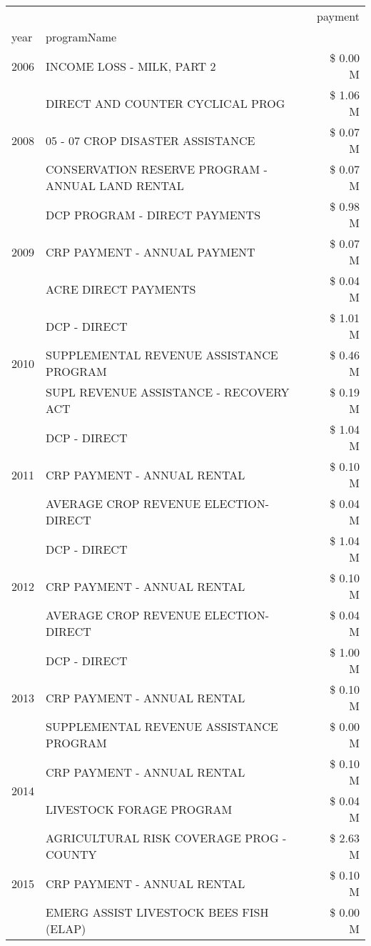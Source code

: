 \begin{tabular}{llr}
\toprule
 &  & payment \\
year & programName &  \\
\midrule
2006 & INCOME LOSS - MILK, PART 2 & \$ 0.00 M \\
\cline{1-3}
\multirow[t]{3}{*}{2008} & DIRECT AND COUNTER CYCLICAL PROG & \$ 1.06 M \\
 & 05 - 07 CROP DISASTER ASSISTANCE & \$ 0.07 M \\
 & CONSERVATION RESERVE PROGRAM - ANNUAL LAND RENTAL & \$ 0.07 M \\
\cline{1-3}
\multirow[t]{3}{*}{2009} & DCP PROGRAM - DIRECT PAYMENTS & \$ 0.98 M \\
 & CRP PAYMENT - ANNUAL PAYMENT & \$ 0.07 M \\
 & ACRE DIRECT PAYMENTS & \$ 0.04 M \\
\cline{1-3}
\multirow[t]{3}{*}{2010} & DCP - DIRECT & \$ 1.01 M \\
 & SUPPLEMENTAL REVENUE ASSISTANCE PROGRAM & \$ 0.46 M \\
 & SUPL REVENUE ASSISTANCE - RECOVERY ACT & \$ 0.19 M \\
\cline{1-3}
\multirow[t]{3}{*}{2011} & DCP - DIRECT & \$ 1.04 M \\
 & CRP PAYMENT - ANNUAL RENTAL & \$ 0.10 M \\
 & AVERAGE CROP REVENUE ELECTION-DIRECT & \$ 0.04 M \\
\cline{1-3}
\multirow[t]{3}{*}{2012} & DCP - DIRECT & \$ 1.04 M \\
 & CRP PAYMENT - ANNUAL RENTAL & \$ 0.10 M \\
 & AVERAGE CROP REVENUE ELECTION-DIRECT & \$ 0.04 M \\
\cline{1-3}
\multirow[t]{3}{*}{2013} & DCP - DIRECT & \$ 1.00 M \\
 & CRP PAYMENT - ANNUAL RENTAL & \$ 0.10 M \\
 & SUPPLEMENTAL REVENUE ASSISTANCE PROGRAM & \$ 0.00 M \\
\cline{1-3}
\multirow[t]{2}{*}{2014} & CRP PAYMENT - ANNUAL RENTAL & \$ 0.10 M \\
 & LIVESTOCK FORAGE PROGRAM & \$ 0.04 M \\
\cline{1-3}
\multirow[t]{3}{*}{2015} & AGRICULTURAL RISK COVERAGE PROG - COUNTY & \$ 2.63 M \\
 & CRP PAYMENT - ANNUAL RENTAL & \$ 0.10 M \\
 & EMERG ASSIST LIVESTOCK BEES FISH (ELAP) & \$ 0.00 M \\
\cline{1-3}

\end{tabular}
